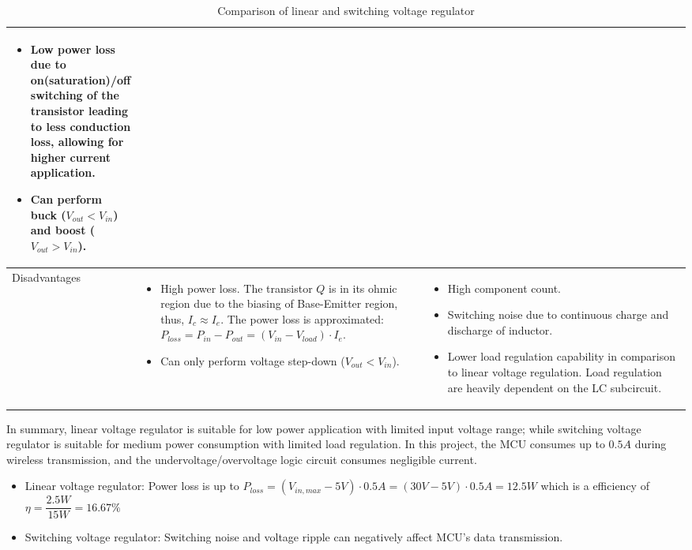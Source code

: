 \documentclass[main.tex]{subfiles}
\begin{document}
\begin{table}[!h]
\begin{tabular}{|m{0.1\linewidth}|m{0.45\linewidth}|m{0.45\linewidth}|}
        \begin{itemize}
            \item Low power loss due to on(saturation)/off switching of the transistor leading to less conduction loss, allowing for higher current application.
            \item Can perform buck ($V_{out} < V_{in}$) and boost ($V_{out} > V_{in}$).
        \end{itemize} \\

        \hline
        Disadvantages & 

        \begin{itemize}
            \item High power loss. The transistor $Q$ is in its ohmic region due to the biasing of Base-Emitter region, thus, $I_{c} \approx I_{e}$. The power loss is approximated: \newline $P_{loss} = P_{in} - P_{out} = (V_{in} - V_{load}) \cdot I_{e}$.
            \item Can only perform voltage step-down ($V_{out} < V_{in}$).
        \end{itemize} &
        
        \begin{itemize}
            \item High component count.
            \item Switching noise due to continuous charge and discharge of inductor.
            \item Lower load regulation capability in comparison to linear voltage regulation. Load regulation are heavily dependent on the LC subcircuit. 
        \end{itemize}  \\

        \hline     
        \end{tabular}
        \caption{Comparison of linear and switching voltage regulator}
        \label{table:voltage_regulator_type}
    \end{table}

    \justify
    In summary, linear voltage regulator is suitable for low power application with limited input voltage range; while switching voltage regulator is suitable for medium power consumption with limited load regulation. In this project, the MCU consumes up to $0.5A$ during wireless transmission, and the undervoltage/overvoltage logic circuit consumes negligible current.

    \begin{itemize}
        \item Linear voltage regulator: Power loss is up to $P_{loss} = (V_{in,max} - 5V) \cdot 0.5A = (30V - 5V) \cdot 0.5A = 12.5W$ which is a efficiency of $\eta = \dfrac{2.5W}{15W} = 16.67\%$
        \item Switching voltage regulator: Switching noise and voltage ripple can negatively affect MCU's data transmission.
    \end{itemize}
    
\end{document}
